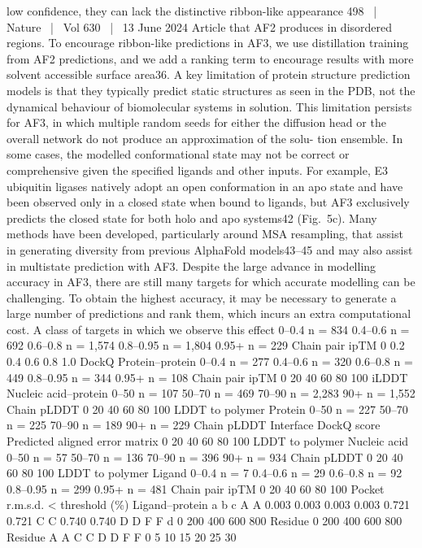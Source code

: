 low confidence, they can lack the distinctive ribbon-like appearance
498  |  Nature  |  Vol 630  |  13 June 2024
Article
that AF2 produces in disordered regions. To encourage ribbon-like
predictions in AF3, we use distillation training from AF2 predictions,
and we add a ranking term to encourage results with more solvent
accessible surface area36.
A key limitation of protein structure prediction models is that they
typically predict static structures as seen in the PDB, not the dynamical
behaviour of biomolecular systems in solution. This limitation persists
for AF3, in which multiple random seeds for either the diffusion head
or the overall network do not produce an approximation of the solu-
tion ensemble.
In some cases, the modelled conformational state may not be correct
or comprehensive given the specified ligands and other inputs. For
example, E3 ubiquitin ligases natively adopt an open conformation
in an apo state and have been observed only in a closed state when
bound to ligands, but AF3 exclusively predicts the closed state for both
holo and apo systems42 (Fig. 5c). Many methods have been developed,
particularly around MSA resampling, that assist in generating diversity
from previous AlphaFold models43–45 and may also assist in multistate
prediction with AF3.
Despite the large advance in modelling accuracy in AF3, there are
still many targets for which accurate modelling can be challenging.
To obtain the highest accuracy, it may be necessary to generate a
large number of predictions and rank them, which incurs an extra
computational cost. A class of targets in which we observe this effect
0–0.4
n = 834
0.4–0.6
n = 692
0.6–0.8
n = 1,574
0.8–0.95
n = 1,804
0.95+
n = 229
Chain pair ipTM
0
0.2
0.4
0.6
0.8
1.0
DockQ
Protein–protein
0–0.4
n = 277
0.4–0.6
n = 320
0.6–0.8
n = 449
0.8–0.95
n = 344
0.95+
n = 108
Chain pair ipTM
0
20
40
60
80
100
iLDDT
Nucleic acid–protein
0–50
n = 107
50–70
n = 469
70–90
n = 2,283
90+
n = 1,552
Chain pLDDT
0
20
40
60
80
100
LDDT to polymer
Protein
0–50
n = 227
50–70
n = 225
70–90
n = 189
90+
n = 229
Chain pLDDT
Interface DockQ score
Predicted aligned error matrix
0
20
40
60
80
100
LDDT to polymer
Nucleic acid
0–50
n = 57
50–70
n = 136
70–90
n = 396
90+
n = 934
Chain pLDDT
0
20
40
60
80
100
LDDT to polymer
Ligand
0–0.4
n = 7
0.4–0.6
n = 29
0.6–0.8
n = 92
0.8–0.95
n = 299
0.95+
n = 481
Chain pair ipTM
0
20
40
60
80
100
Pocket r.m.s.d. < threshold (\%)
Ligand–protein
a
b
c
A
A
0.003
0.003
0.003
0.003
0.721
0.721
C
C
0.740
0.740
D
D
F
F
d
0
200
400
600
800
Residue
0
200
400
600
800
Residue
A
A
C
C
D
D
F
F
0
5
10
15
20
25
30
